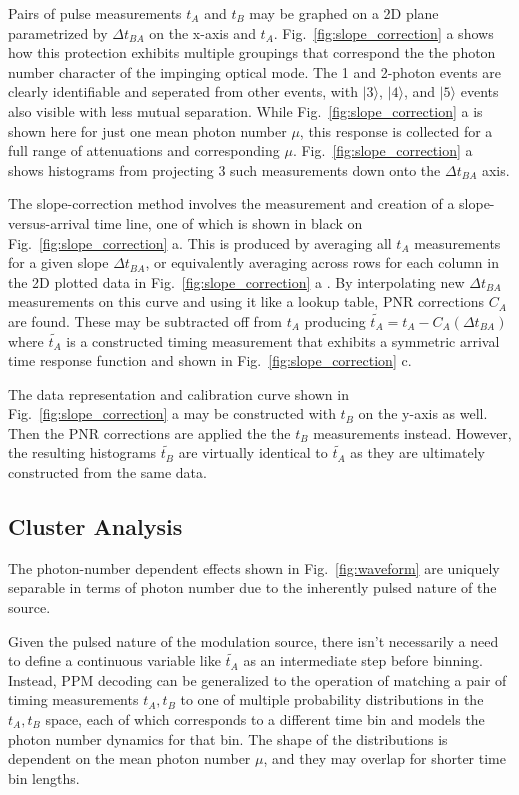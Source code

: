 \documentclass[11pt]{caltech_thesis} %
\begin{document}
Pairs of pulse measurements $t_A$ and $t_B$ may be graphed on a 2D plane parametrized by $\Delta t_{BA}$ on the x-axis and $t_A$. Fig.~\ref{fig:slope_correction} a shows how this protection exhibits multiple groupings that correspond the the photon number character of the impinging optical mode. The 1 and 2-photon events are clearly identifiable and seperated from other events, with $|3\rangle$, $|4\rangle$, and $|5\rangle$ events also visible with less mutual separation. While Fig.~\ref{fig:slope_correction} a is shown here for just one mean photon number $\mu$, this response is collected for a full range of attenuations and corresponding $\mu$. Fig.~\ref{fig:slope_correction} a shows histograms from projecting 3 such measurements down onto the $\Delta t_{BA}$ axis.

The slope-correction method involves the measurement and creation of a slope-versus-arrival time line, one of which is shown in black on Fig.~\ref{fig:slope_correction} a. This is produced by averaging all $t_A$ measurements for a given slope $\Delta t_{BA}$, or equivalently averaging across rows for each column in the 2D plotted data in Fig.~\ref{fig:slope_correction} a . By interpolating new $\Delta t_{BA}$ measurements on this curve and using it like a lookup table, PNR corrections $C_A$ are found. These may be subtracted off from $t_A$ producing $\tilde{t_A} = t_A - C_A(\Delta t_{BA})$ where $\tilde{t_A}$ is a constructed timing measurement that exhibits a symmetric arrival time response function and shown in Fig.~\ref{fig:slope_correction} c.~

The data representation and calibration curve shown in Fig.~\ref{fig:slope_correction} a may be constructed with $t_B$ on the y-axis as well. Then the PNR corrections are applied the the $t_B$ measurements instead. However, the resulting histograms $\tilde{t_B}$ are virtually identical to $\tilde{t_A}$ as they are ultimately constructed from the same data.

\hypertarget{cluster-analysis}{%
\subsection{Cluster Analysis}\label{cluster-analysis}}

The photon-number dependent effects shown in Fig.~\ref{fig:waveform} are uniquely separable in terms of photon number due to the inherently pulsed nature of the source.

Given the pulsed nature of the modulation source, there isn't necessarily a need to define a continuous variable like $\tilde{t_A}$ as an intermediate step before binning. Instead, PPM decoding can be generalized to the operation of matching a pair of timing measurements $t_A, t_B$ to one of multiple probability distributions in the $t_A, t_B$ space, each of which corresponds to a different time bin and models the photon number dynamics for that bin. The shape of the distributions is dependent on the mean photon number $\mu$, and they may overlap for shorter time bin lengths.
\end{document}
